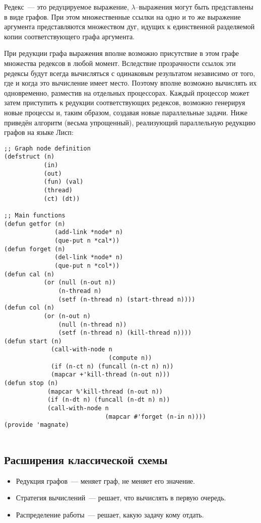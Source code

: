 Редекс~--- это редуцируемое выражение, $\lambda$--выражения могут
быть представлены в виде графов. При этом множественные ссылки
на одно и то же выражение аргумента представляются множеством
дуг, идущих к единственной разделяемой копии соответствующего
графа аргумента.

При редукции графа выражения вполне возможно присутствие в этом
графе множества редексов в любой момент. Вследствие прозрачности
ссылок эти редексы будут всегда вычисляться с одинаковым результатом
независимо от того, где и когда это вычисление имеет место. Поэтому
вполне возможно вычислять их одновременно, разместив на отдельных
процессорах. Каждый процессор может затем приступить к редукции
соответствующих редексов, возможно генерируя новые процессы и,
таким образом, создавая новые параллельные задачи. Ниже приведён
алгоритм (весьма упрощенный), реализующий параллельную редукцию
графов на языке Лисп:
\begin{verbatim}
;; Graph node definition
(defstruct (n)
           (in)
           (out)
           (fun) (val)
           (thread)
           (ct) (dt))

;; Main functions
(defun getfor (n)
              (add-link *node* n)
              (que-put n *cal*))
(defun forget (n)
              (del-link *node* n)
              (que-put n *col*))
(defun cal (n)
           (or (null (n-out n))
               (n-thread n)
               (setf (n-thread n) (start-thread n))))
(defun col (n)
           (or (n-out n)
               (null (n-thread n))
               (setf (n-thread n) (kill-thread n))))
(defun start (n)
             (call-with-node n
                             (compute n))
             (if (n-ct n) (funcall (n-ct n) n))
             (mapcar +'kill-thread (n-out n)))
(defun stop (n)
            (mapcar %'kill-thread (n-out n))
            (if (n-dt n) (funcall (n-dt n) n))
            (call-with-node n
                            (mapcar #'forget (n-in n))))
(provide 'magnate)
	
\end{verbatim}

\subsection{Расширения классической схемы}
\begin{itemize}
\item Редукция графов~--- меняет граф, не меняет его значение.
\item Стратегия вычислений~--- решает, что вычислять в первую очередь.
\item Распределение работы~--- решает, какую задачу кому отдать.
\end{itemize}

